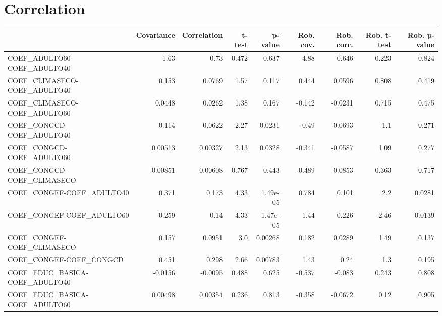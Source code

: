 \section{Correlation}
\begin{tabular}{lrrrrrrrr}
\toprule
{} &  Covariance &  Correlation &  t-test &  p-value &  Rob. cov. &  Rob. corr. &  Rob. t-test &  Rob. p-value \\
\midrule
COEF\_ADULTO60-COEF\_ADULTO40           &        1.63 &         0.73 &   0.472 &    0.637 &       4.88 &       0.646 &        0.223 &         0.824 \\
COEF\_CLIMASECO-COEF\_ADULTO40          &       0.153 &       0.0769 &    1.57 &    0.117 &      0.444 &      0.0596 &        0.808 &         0.419 \\
COEF\_CLIMASECO-COEF\_ADULTO60          &      0.0448 &       0.0262 &    1.38 &    0.167 &     -0.142 &     -0.0231 &        0.715 &         0.475 \\
COEF\_CONGCD-COEF\_ADULTO40             &       0.114 &       0.0622 &    2.27 &   0.0231 &      -0.49 &     -0.0693 &          1.1 &         0.271 \\
COEF\_CONGCD-COEF\_ADULTO60             &     0.00513 &      0.00327 &    2.13 &   0.0328 &     -0.341 &     -0.0587 &         1.09 &         0.277 \\
COEF\_CONGCD-COEF\_CLIMASECO            &     0.00851 &      0.00608 &   0.767 &    0.443 &     -0.489 &     -0.0853 &        0.363 &         0.717 \\
COEF\_CONGEF-COEF\_ADULTO40             &       0.371 &        0.173 &    4.33 & 1.49e-05 &      0.784 &       0.101 &          2.2 &        0.0281 \\
COEF\_CONGEF-COEF\_ADULTO60             &       0.259 &         0.14 &    4.33 & 1.47e-05 &       1.44 &       0.226 &         2.46 &        0.0139 \\
COEF\_CONGEF-COEF\_CLIMASECO            &       0.157 &       0.0951 &     3.0 &  0.00268 &      0.182 &      0.0289 &         1.49 &         0.137 \\
COEF\_CONGEF-COEF\_CONGCD               &       0.451 &        0.298 &    2.66 &  0.00783 &       1.43 &        0.24 &          1.3 &         0.195 \\
COEF\_EDUC\_BASICA-COEF\_ADULTO40        &     -0.0156 &      -0.0095 &   0.488 &    0.625 &     -0.537 &      -0.083 &        0.243 &         0.808 \\
COEF\_EDUC\_BASICA-COEF\_ADULTO60        &     0.00498 &      0.00354 &   0.236 &    0.813 &     -0.358 &     -0.0672 &         0.12 &         0.905 \\

\end{tabular}
